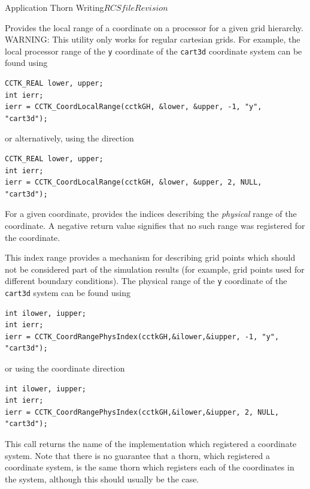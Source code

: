\begin{cactuspart}{Application Thorn Writing}{$RCSfile$}{$Revision$}
\begin{Lentry}
\item[\texttt{CCTK\_CoordLocalRange}]

Provides the local range of a coordinate on a processor for a given
grid hierarchy. WARNING: This utility only works for regular
cartesian grids. For example, the local processor range of the
\texttt{y} coordinate of the \texttt{cart3d} coordinate system can be found using
%
\begin{verbatim}
CCTK_REAL lower, upper;
int ierr;
ierr = CCTK_CoordLocalRange(cctkGH, &lower, &upper, -1, "y", "cart3d");
\end{verbatim}
or alternatively, using the direction
%
\begin{verbatim}
CCTK_REAL lower, upper;
int ierr;
ierr = CCTK_CoordLocalRange(cctkGH, &lower, &upper, 2, NULL, "cart3d");
\end{verbatim}

\item[\texttt{CCTK\_CoordRangePhysIndex}]

For a given coordinate, provides the indices describing the \emph{physical}
range of the coordinate. A negative return value signifies that no such range
was registered for the coordinate.

This index range provides a mechanism for describing
grid points which should not be considered part of the simulation results (for example,
grid points used for different boundary conditions). The physical range of the
\texttt{y} coordinate of the \texttt{cart3d} system can be found using

\begin{verbatim}
int ilower, iupper;
int ierr;
ierr = CCTK_CoordRangePhysIndex(cctkGH,&ilower,&iupper, -1, "y", "cart3d");
\end{verbatim}
or using the coordinate direction
\begin{verbatim}
int ilower, iupper;
int ierr;
ierr = CCTK_CoordRangePhysIndex(cctkGH,&ilower,&iupper, 2, NULL, "cart3d");
\end{verbatim}

\item[\texttt{CCTK\_CoordSystemImplementation}]

This call returns the name of the implementation which registered a coordinate system.
Note that there is no guarantee that a thorn, which registered a coordinate system, is
the same thorn which registers each of the coordinates in the system, although this
should usually be the case.

\end{Lentry}


\end{cactuspart}
